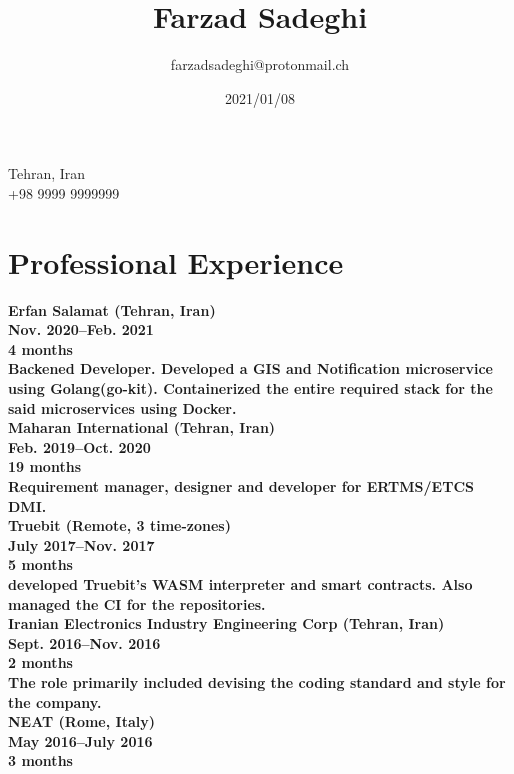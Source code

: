 \documentclass[8pt]{article}
\title{\bfseries Farzad Sadeghi}
\author{farzadsadeghi@protonmail.ch}
\date{2021/01/08}
\begin{document}
\begin{multicols}{2}
  \maketitle
  \begin{center}
    \begin{minipage}[ht]{0.2\textwidth}{\centering}
      \vspace*{\fill}
      \centering
      Tehran, Iran\\
      +98 9999 9999999
      \centering
      \vspace*{\fill}
    \end{minipage}
  \end{center}

  \section*{Professional Experience}
  \bf Erfan Salamat (Tehran, Iran)\\
  Nov. 2020--Feb. 2021\\
  4 months\\
  \normalfont Backened Developer. Developed a GIS and Notification microservice using Golang(go-kit). Containerized the entire required stack for the said microservices using Docker.\\[5pt]
  \bf Maharan International (Tehran, Iran)\\
  Feb. 2019--Oct. 2020\\
  19 months\\
  \normalfont Requirement manager, designer and developer for ERTMS/ETCS DMI.\\[5pt]
  \bf Truebit (Remote, 3 time-zones)\\
  July 2017--Nov. 2017\\
  5 months\\
  \normalfont developed Truebit's WASM interpreter and smart contracts. Also managed the CI for the repositories.\\[5pt]
  \bf Iranian Electronics Industry Engineering Corp (Tehran, Iran)\\
  Sept. 2016--Nov. 2016\\
  2 months\\
  \normalfont The role primarily included devising the coding standard and style for the company.\\[5pt]
  \bf NEAT (Rome, Italy)\\
  May 2016--July 2016\\
  3 months\\

\end{multicols}
\end{document}
